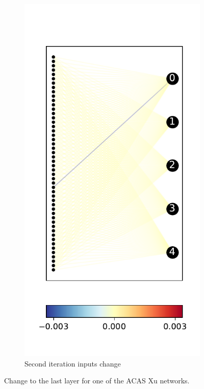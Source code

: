 \documentclass{easychair}
\begin{document}
\begin{figure}
\begin{subfigure}{0.2\linewidth}
\end{subfigure}
\begin{subfigure}{0.2\linewidth}
  \includegraphics[width=\linewidth]{./images/ACASXU_2_9_3_vals.pdf}
  \caption{Second iteration inputs change}
\end{subfigure}
\caption{Change to the last layer for one of the ACAS Xu networks.}
\label{fig:lastLayerACASXU}
\end{figure}
\end{document}
